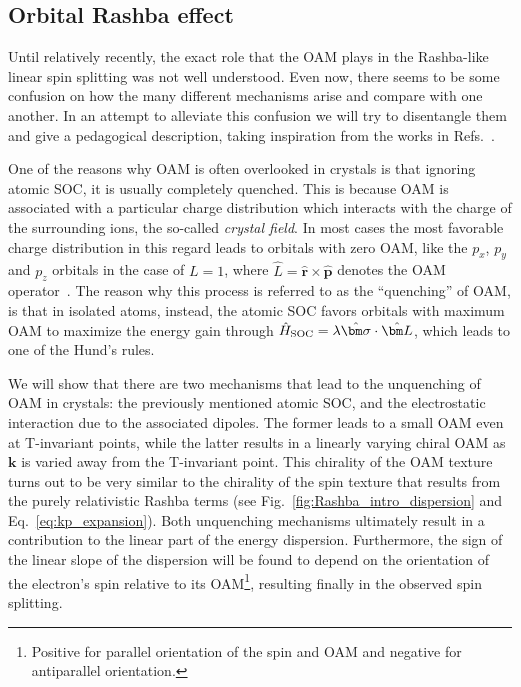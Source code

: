 \subsection{Orbital Rashba effect}
Until relatively recently, the exact role that the \gls{OAM} plays in the Rashba-like linear spin splitting was not well understood. Even now, there seems to be some confusion on how the many different mechanisms arise and compare with one another.   
In an attempt to alleviate this confusion we will try to disentangle them and give a pedagogical description, taking inspiration from the works in Refs.~\cite{Petersen2000,Park2011,Park2012,Kim2014,Park2015,Go2016}.
    
One of the reasons why \gls{OAM} is often overlooked in crystals is that ignoring atomic \gls{SOC}, it is usually completely quenched.
This is because \gls{OAM} is associated with a particular charge distribution which interacts with the charge of the surrounding ions, the so-called {\it crystal field}.
In most cases the most favorable charge distribution in this regard leads to orbitals with zero \gls{OAM}, like the $p_x$, $p_y$ and $p_z$ orbitals in the case of $L=1$, where $\hat{L} = \hat{\bm r} \times \hat{\bm p}$ denotes the \gls{OAM} operator~\cite{Ballhausen}.
The reason why this process is referred to as the ``quenching'' of \gls{OAM}, is that in isolated atoms, instead, the atomic \gls{SOC} favors orbitals with maximum \gls{OAM} to maximize the energy gain through $\hat{H}_{\rm SOC} = \lambda \hat{\bm \sigma} \cdot \hat{\bm L}$, which leads to one of the Hund's rules.
    
We will show that there are two mechanisms that lead to the unquenching of \gls{OAM} in crystals: the previously mentioned atomic \gls{SOC}, and the electrostatic interaction due to the associated dipoles.
The former leads to a small \gls{OAM} even at \gls{T}-invariant points, while the latter results in a linearly varying chiral \gls{OAM} as $\bm k$ is varied away from the \gls{T}-invariant point.
This chirality of the \gls{OAM} texture turns out to be very similar to the chirality of the spin texture that results from the purely relativistic Rashba terms (see Fig.~\ref{fig:Rashba_intro_dispersion} and Eq.~\eqref{eq:kp_expansion}).
Both unquenching mechanisms ultimately result in a contribution to the linear part of the energy dispersion.
Furthermore, the sign of the linear slope of the dispersion will be found to depend on the orientation of the electron's spin relative to its \gls{OAM}\footnote{Positive for parallel orientation of the spin and \gls{OAM} and negative for antiparallel orientation.}, resulting finally in the observed spin splitting.
    
